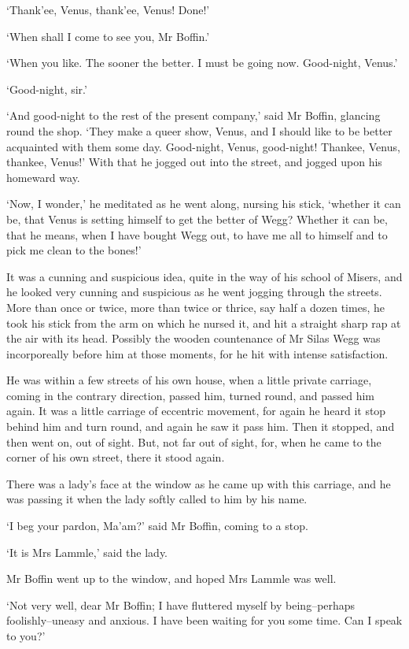 ‘Thank’ee, Venus, thank’ee, Venus! Done!’

‘When shall I come to see you, Mr Boffin.’

‘When you like. The sooner the better. I must be going now. Good-night,
Venus.’

‘Good-night, sir.’

‘And good-night to the rest of the present company,’ said Mr Boffin,
glancing round the shop. ‘They make a queer show, Venus, and I should
like to be better acquainted with them some day. Good-night, Venus,
good-night! Thankee, Venus, thankee, Venus!’ With that he jogged out
into the street, and jogged upon his homeward way.

‘Now, I wonder,’ he meditated as he went along, nursing his stick,
‘whether it can be, that Venus is setting himself to get the better of
Wegg? Whether it can be, that he means, when I have bought Wegg out, to
have me all to himself and to pick me clean to the bones!’

It was a cunning and suspicious idea, quite in the way of his school
of Misers, and he looked very cunning and suspicious as he went jogging
through the streets. More than once or twice, more than twice or thrice,
say half a dozen times, he took his stick from the arm on which he
nursed it, and hit a straight sharp rap at the air with its head.
Possibly the wooden countenance of Mr Silas Wegg was incorporeally
before him at those moments, for he hit with intense satisfaction.

He was within a few streets of his own house, when a little private
carriage, coming in the contrary direction, passed him, turned round,
and passed him again. It was a little carriage of eccentric movement,
for again he heard it stop behind him and turn round, and again he saw
it pass him. Then it stopped, and then went on, out of sight. But, not
far out of sight, for, when he came to the corner of his own street,
there it stood again.

There was a lady’s face at the window as he came up with this carriage,
and he was passing it when the lady softly called to him by his name.

‘I beg your pardon, Ma’am?’ said Mr Boffin, coming to a stop.

‘It is Mrs Lammle,’ said the lady.

Mr Boffin went up to the window, and hoped Mrs Lammle was well.

‘Not very well, dear Mr Boffin; I have fluttered myself by
being--perhaps foolishly--uneasy and anxious. I have been waiting for
you some time. Can I speak to you?’

